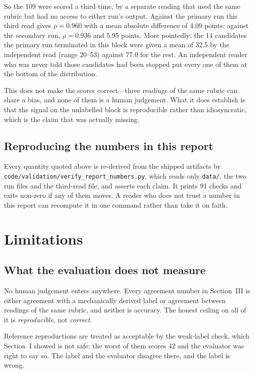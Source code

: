 \documentclass[conference]{IEEEtran}
\begin{document}
So the 109 were scored a third time, by a separate reading that used the
same rubric but had no access to either run's output. Against the
primary run this third read gives $\rho = 0.960$ with a mean absolute
difference of 4.09 points; against the secondary run,
$\rho = 0.936$ and 5.95 points. More pointedly: the 14 candidates the
primary run terminated in this block were given a mean of 32.5 by the
independent read (range 20--53) against 77.0 for the rest. An
independent reader who was never told those candidates had been stopped
put every one of them at the bottom of the distribution.

This does not make the scores correct---three readings of the same
rubric can share a bias, and none of them is a human judgement. What it
does establish is that the signal on the unlabelled block is
reproducible rather than idiosyncratic, which is the claim that was
actually missing.

\subsection{Reproducing the numbers in this report}
Every quantity quoted above is re-derived from the shipped artifacts by
\texttt{code/valid\-ation/verify\_report\_numbers.py}, which reads only
\texttt{data/}, the two run files and the third-read file, and asserts
each claim. It prints 91 checks and exits non-zero if any of them moves.
A reader who does not trust a number in this report can recompute it in
one command rather than take it on faith.

\section{Limitations}

\subsection{What the evaluation does not measure}
No human judgement enters anywhere. Every agreement number in
Section~III is either agreement with a mechanically derived label or
agreement between readings of the same rubric, and neither is accuracy.
The honest ceiling on all of it is \emph{reproducible}, not
\emph{correct}.

Reference reproductions are treated as acceptable by the weak-label
check, which Section~I showed is not safe: the worst of them scores 42
and the evaluator was right to say so. The label and the evaluator
disagree there, and the label is wrong.
\end{document}

